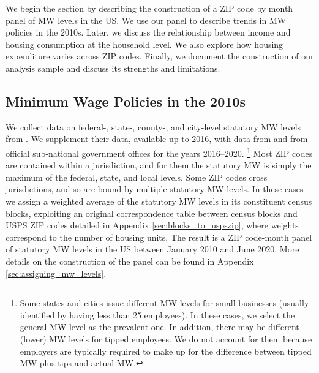 
We begin the section by describing the construction of a ZIP code by month panel
of MW levels in the US. 
We use our panel to describe trends in MW policies in the 2010s.
Later, we discuss the relationship between income and housing consumption at the
household level.
We also explore how housing expenditure varies across ZIP codes.
Finally, we document the construction of our analysis sample and discuss
its strengths and limitations.

\subsection{Minimum Wage Policies in the 2010s}
\label{sec:data_mw_panel}

We collect data on federal-, state-, county-, and city-level statutory MW levels 
from \textcite{VaghulZipperer2016}.
We supplement their data, available up to 2016, with data from 
\textcite{BerkeleyLaborCenter} and from official sub-national government offices 
for the years 2016--2020.%
\footnote{Some states and cities issue different MW levels for small businesses
(usually identified by having less than 25 employees).
In these cases, we select the general MW level as the prevalent one.
In addition, there may be different (lower) MW levels for tipped employees.
We do not account for them because employers are typically required to make up 
for the difference between tipped MW plus tips and actual MW.}
%
%
Most ZIP codes are contained within a jurisdiction, and for them the statutory 
MW is simply the maximum of the federal, state, and local levels.
Some ZIP codes cross jurisdictions, and so are bound by multiple statutory MW 
levels.
In these cases we assign a weighted average of the statutory MW levels in its
constituent census blocks, exploiting an original correspondence table between 
census blocks and USPS ZIP codes detailed in Appendix 
\ref{sec:blocks_to_uspszip}, where weights correspond to the number of housing
units.
The result is a ZIP code-month panel of statutory MW levels in the US between
January 2010 and June 2020.
More details on the construction of the panel can be found in Appendix 
\ref{sec:assigning_mw_levels}.

